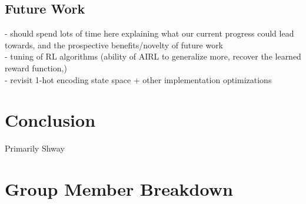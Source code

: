 \documentclass[letterpaper]{article} %
\begin{document}
\subsection{Future Work}
- should spend lots of time here explaining what our current progress could lead towards, and the prospective benefits/novelty of future work\\

- tuning of RL algorithms (ability of AIRL to generalize more, recover the learned reward function,)\\
- revisit 1-hot encoding state space + other implementation optimizations \\

\section{Conclusion}
Primarily Shway 

\section{Group Member Breakdown}


\end{document}
